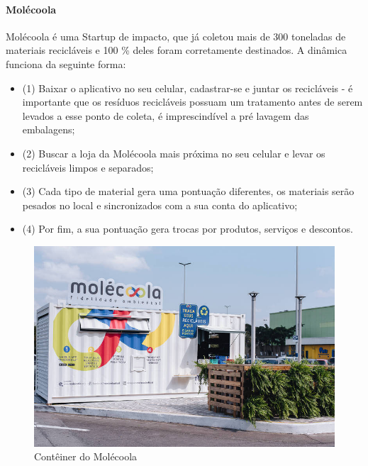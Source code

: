 \paragraph{\textbf{Molécoola}}
Molécoola é uma Startup de impacto, que já coletou mais de 300 toneladas de materiais recicláveis e 100 \% deles foram corretamente destinados. A dinâmica funciona da seguinte forma: 
\begin{itemize}
	\item (1) Baixar o aplicativo no seu celular, cadastrar-se e juntar os recicláveis - é importante que os resíduos recicláveis possuam um tratamento antes de serem levados a esse ponto de coleta, é imprescindível a pré lavagem das embalagens;
	\item (2) Buscar a loja da Molécoola mais próxima no seu celular e levar os recicláveis limpos e separados; 
	\item (3) Cada tipo de material gera uma pontuação diferentes, os materiais serão pesados no local e sincronizados com a sua conta do aplicativo;
	\item (4) Por fim, a sua pontuação gera trocas por produtos, serviços e descontos.
\end{itemize}


\begin{figure}[h]
	\centering
	\includegraphics[width=0.7\linewidth]{produtos/prodquatro/molecoola}
	\caption{Contêiner do Molécoola}
	\label{fig:molecoola}
\end{figure}
\FloatBarrier

